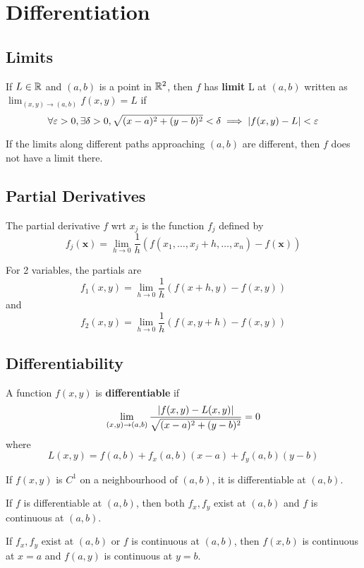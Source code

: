 \documentclass{article}
\begin{document}
\section{Differentiation}
\subsection{Limits}
\begin{definition}
  If $L \in \mathbb{R}$ and $(a, b)$ is a point in $\mathbb{R}^2$, then $f$ has \textbf{limit} L at $(a, b)$ written as $\lim_{(x, y) \to (a, b)} f(x, y) = L$ if
  \[\forall \varepsilon > 0, \exists \delta > 0, \sqrt{(x-a)^2 + (y-b)^2} < \delta \implies \abs{f(x, y) - L} < \varepsilon\]
\end{definition}
\begin{theorem}
  If the limits along different paths approaching $(a, b)$ are different, then $f$ does not have a limit there.
\end{theorem}
\subsection{Partial Derivatives}
\begin{definition}
  The partial derivative $f$ wrt $x_j$ is the function $f_j$ defined by \[
    f_j(\textbf{x}) = \lim_{h\to0} \frac{1}{h} \left(f(x_1, \dots, x_j + h, \dots, x_n) - f(\textbf{x})\right)
  \]
\end{definition}
\begin{example}
  For 2 variables, the partials are \[
    f_1(x, y) = \lim_{h\to0} \frac{1}{h}(f(x+h,y) - f(x, y))
  \] and \[
    f_2(x, y) = \lim_{h\to0} \frac{1}{h}(f(x,y+h) - f(x, y))
  \]
\end{example}
\subsection{Differentiability}
\begin{definition}
  A function $f(x, y)$ is \textbf{differentiable} if \[
    \lim_{(x, y) \to (a, b)} \frac{\abs{f(x, y) - L(x, y)}}{\sqrt{(x-a)^2+(y-b)^2}} = 0
  \] where \[
    L(x, y) = f(a, b) + f_x(a, b)(x-a) + f_y(a, b)(y-b)
  \]
\end{definition}
\begin{theorem}
  If $f(x, y)$ is $C^1$ on a neighbourhood of $(a, b)$, it is differentiable at $(a, b)$.
\end{theorem}
\begin{theorem}
  If $f$ is differentiable at $(a, b)$, then both $f_x, f_y$ exist at $(a, b)$ and $f$ is continuous at $(a, b)$.
\end{theorem}
\begin{corollary}
  If $f_x, f_y$ exist at $(a, b)$ or $f$ is continuous at $(a, b)$, then $f(x, b)$ is continuous at $x=a$ and $f(a, y)$ is continuous at $y=b$.
\end{corollary}
\end{document}
